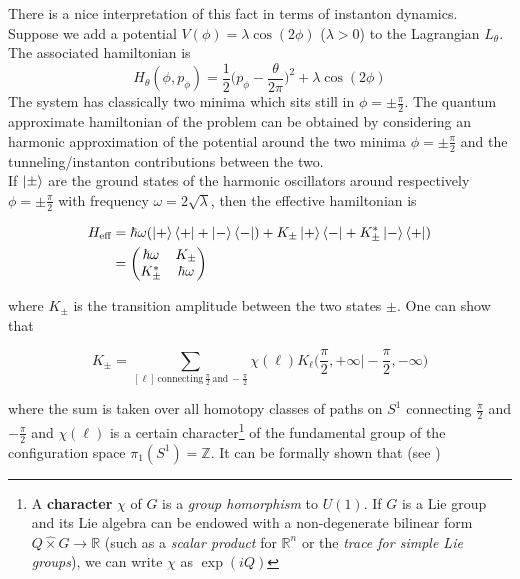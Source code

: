There is a nice interpretation of this fact in terms of instanton dynamics. Suppose we add a potential $V(\phi) = \lambda \cos(2 \phi)$ ($\lambda>0$) to the Lagrangian $L_{\theta}$. The associated hamiltonian is
\begin{equation}
    H_{\theta}(\phi, p_{\phi}) = \frac{1}{2}\bigg( p_{\phi} - \frac{\theta}{2 \pi} \bigg)^2 + \lambda \cos(2 \phi)
\end{equation}
The system has classically two minima which sits still in $\phi= \pm \frac{\pi}{2}$. The quantum approximate hamiltonian of the problem can be obtained by considering an harmonic approximation of the potential around the two minima $\phi= \pm \frac{\pi}{2}$ and the tunneling/instanton contributions between the two. \\

If $\ket{\pm}$ are the ground states of the harmonic oscillators around respectively  $\phi= \pm \frac{\pi}{2}$ with frequency $\omega = 2 \sqrt{\lambda}$, then the effective hamiltonian is


\begin{equation}
\begin{aligned}
    H_{\text{eff}} &= \hbar \omega ( \ket{+}\bra{+} +   \ket{-}\bra{-} )+ K_{\pm}  \ket{+}\bra{-} +   K_{\pm}^*\ket{-}\bra{+} )\\
    &= \begin{pmatrix}
 \hbar \omega &K_{\pm}\\
 K_{\pm}^* &\hbar \omega
    \end{pmatrix}
    \end{aligned}
\end{equation}

where $K_{\pm}$ is the transition amplitude between the two states $\pm$. One can show that

\begin{equation}
    K_{\pm} = \sum_{[\ell]\, \text{connecting} \, \frac{\pi}{2}\,\text{and}\, -\frac{\pi}{2}} \chi(\ell) K_{\ell}\bigg(\frac{\pi}{2}, + \infty \bigg| -\frac{\pi}{2}, - \infty \bigg)
\end{equation}

where the sum is taken over all homotopy classes of paths on $S^1$ connecting $\frac{\pi}{2}$ and $-\frac{ \pi}{2}$ and $\chi(\ell)$ is a certain character\footnote{
    A \textbf{character} $\chi$ of $G$ is a \textit{group homorphism} to $U(1)$. If $G$ is a Lie group and its Lie algebra can be endowed with a non-degenerate bilinear form $Q \hat \times G \to \mathbb{R}$ (such as a \textit{scalar product} for $\mathbb{R}^n$ or the \textit{trace for simple Lie groups}), we can write $\chi$ as $\exp(i Q)$

} 
of the fundamental group of the configuration space $\pi_1(S^1) = \mathbb{Z}$. It can be formally shown that (see \cite[Section 2.8]{percacci})

